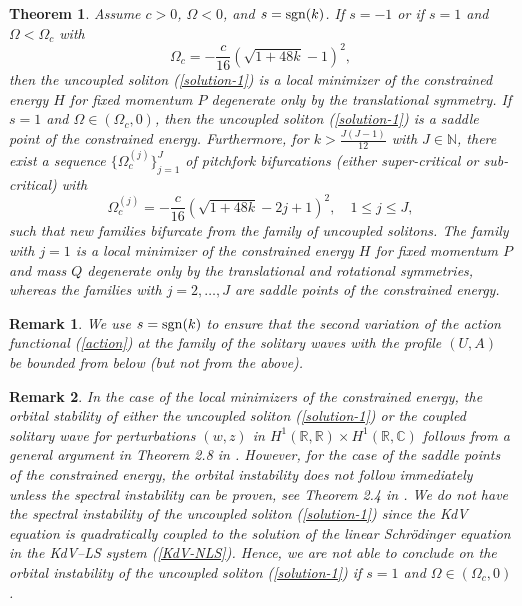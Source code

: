 \documentclass[12pt,reqno]{amsart}
\numberwithin{equation}{section}
\newtheorem{remark}{Remark}
\newtheorem{theorem}{Theorem}
\begin{document}
\begin{theorem}
	\label{theorem-main}
	Assume $c > 0$, $\Omega < 0$, and $s = {\rm sgn}(k)$. 
	If $s = -1$ or if $s = 1$ and $\Omega < \Omega_c$ with 
	\begin{equation}
	\label{Omega-c-intro}
	\Omega_c = -\frac{c}{16} \left( \sqrt{1 + 48 k} - 1 \right)^2,
	\end{equation}
	then the uncoupled soliton (\ref{solution-1}) is a local minimizer of the constrained energy $H$ for fixed momentum $P$ degenerate only by the translational symmetry. If $s = 1$ and  $\Omega \in (\Omega_c,0)$, 
	then the uncoupled soliton (\ref{solution-1}) is a saddle point of the constrained energy. Furthermore, for $k > \frac{J(J-1)}{12}$ with $J \in \mathbb{N}$, there exist a sequence $\{ \Omega_c^{(j)} \}_{j=1}^J$ of pitchfork bifurcations 
	(either super-critical or sub-critical) with 
		\begin{equation}
	\label{Omega-bif-intro}
	\Omega_c^{(j)} = -\frac{c}{16} \left( \sqrt{1 + 48 k} - 2j + 1 \right)^2, 
	\quad 1 \leq j \leq J, 
	\end{equation} 
	such that new families bifurcate from the family of uncoupled solitons. The family with $j = 1$ is a local minimizer of the constrained energy $H$ for fixed momentum $P$ and mass $Q$ degenerate only by the translational and rotational symmetries, whereas the families with $j = 2,\dots,J$ are saddle points of the constrained energy.
\end{theorem}

\begin{remark}
	We use $s = {\rm sgn}(k)$ to ensure that the second variation of the action functional (\ref{action}) at the family of the solitary waves with the profile $(U,A)$ be bounded from below (but not from the above). 
	\label{rem-values-of-s}
\end{remark}

\begin{remark}
	In the case of the local minimizers of the constrained energy, the orbital stability of either the uncoupled soliton (\ref{solution-1})  
	or the coupled solitary wave for perturbations $(w,z)$ in $H^1(\mathbb{R},\mathbb{R}) \times H^1(\mathbb{R},\mathbb{C})$ 
	follows from a general argument in Theorem 2.8 in \cite{Dmitry}. However, for the case of the saddle points of the constrained energy, 
	the orbital instability does not follow immediately unless the spectral instability can be proven, see Theorem 2.4 in \cite{Dmitry}. We do not have the spectral instability of the uncoupled soliton (\ref{solution-1}) 
	since the KdV equation is quadratically coupled to the solution of the 
	linear Schr\"{o}dinger equation in the KdV--LS system (\ref{KdV-NLS}). 
	Hence, we are not able to conclude on the 
	orbital instability of the uncoupled soliton (\ref{solution-1}) if $s = 1$ and $\Omega \in (\Omega_c,0)$.
\end{remark}
\end{document}
